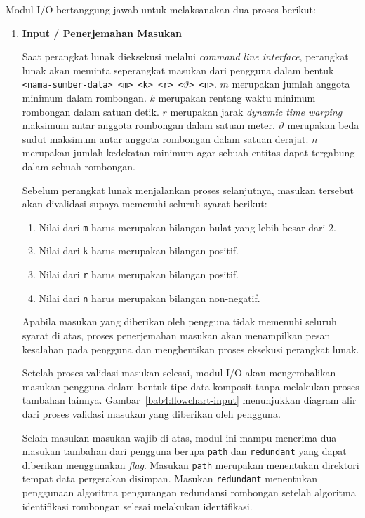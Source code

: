 Modul I/O bertanggung jawab untuk melaksanakan dua proses berikut:

\begin{enumerate}
    \item \textbf{Input / Penerjemahan Masukan}
    
    Saat perangkat lunak dieksekusi melalui \textit{command line interface}, perangkat lunak akan meminta seperangkat masukan dari pengguna dalam bentuk \texttt{<nama-sumber-data> <m> <k> <r> <$\vartheta$> <n>}. $m$ merupakan jumlah anggota minimum dalam rombongan. $k$ merupakan rentang waktu minimum rombongan dalam satuan detik. $r$ merupakan jarak \textit{dynamic time warping} maksimum antar anggota rombongan dalam satuan meter. $\vartheta$ merupakan beda sudut maksimum antar anggota rombongan dalam satuan derajat. $n$ merupakan jumlah kedekatan minimum agar sebuah entitas dapat tergabung dalam sebuah rombongan.
    
    Sebelum perangkat lunak menjalankan proses selanjutnya, masukan tersebut akan divalidasi supaya memenuhi seluruh syarat berikut:
    
    \begin{enumerate}
        \item Nilai dari \texttt{m} harus merupakan bilangan bulat yang lebih besar dari 2.
        \item Nilai dari \texttt{k} harus merupakan bilangan positif.
        \item Nilai dari \texttt{r} harus merupakan bilangan positif.
        \item Nilai dari \texttt{n} harus merupakan bilangan non-negatif.
    \end{enumerate}
    
    Apabila masukan yang diberikan oleh pengguna tidak memenuhi seluruh syarat di atas, proses penerjemahan masukan akan menampilkan pesan kesalahan pada pengguna dan menghentikan proses eksekusi perangkat lunak.
    
    Setelah proses validasi masukan selesai, modul I/O akan mengembalikan masukan pengguna dalam bentuk tipe data komposit tanpa melakukan proses tambahan lainnya. Gambar~\ref{bab4:flowchart-input} menunjukkan diagram alir dari proses validasi masukan yang diberikan oleh pengguna.
    
    Selain masukan-masukan wajib di atas, modul ini mampu menerima dua masukan tambahan dari pengguna berupa \texttt{path} dan \texttt{redundant} yang dapat diberikan menggunakan \textit{flag}. Masukan \texttt{path} merupakan menentukan direktori tempat data pergerakan disimpan. Masukan \texttt{redundant} menentukan penggunaan algoritma pengurangan redundansi rombongan setelah algoritma identifikasi rombongan selesai melakukan identifikasi.
    

\end{enumerate}
